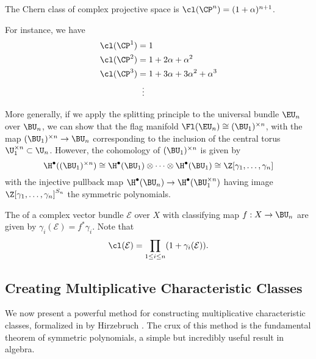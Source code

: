 \begin{corollary}
	The Chern class of complex projective space is $\cl(\CP^n)=(1+\alpha)^{n+1}$.
\end{corollary}
\begin{example}
	For instance, we have
	\[
		\begin{aligned}
			\cl(\CP^1) &= 1\\
			\cl(\CP^2) &= 1+2\alpha+\alpha^2\\
			\cl(\CP^3) &= 1+3\alpha + 3\alpha^2+\alpha^3\\
								 &\;\;\vdots
		\end{aligned}
	\]
\end{example}

More generally, if we apply the splitting principle to the universal bundle $\EU_n$ over $\BU_n$, we can show that the flag manifold $\Fl(\EU_n)\cong (\BU_1)^{\times n}$, with the map $(\BU_1)^{\times n} \to \BU_n$ corresponding to the inclusion of the central torus $\U_1^{\times n}\subset \U_n$. However, the cohomology of $(\BU_1)^{\times n}$ is given by
\[
	\H^\bullet((\BU_1)^{\times n}) \cong \H^\bullet(\BU_1)\otimes\cdots\otimes \H^\bullet(\BU_1) \cong \Z[\gamma_1,\ldots,\gamma_n]
\]
with the injective pullback map $\H^\bullet(\BU_n) \to \H^\bullet(\BU_1^{\times n})$ having image $\Z[\gamma_1,\ldots, \gamma_n]^{S_n}$ the symmetric polynomials.


\begin{definition}\label{def:chern-roots}
	The  of a complex vector bundle $\mathcal{E}$ over $X$ with classifying map $f : X \to \BU_n$ are given by $\gamma_i(\mathcal{E}) = f^*\gamma_i$. Note that
	\[ \cl(\mathcal{E}) = \prod_{1\leq i \leq n} (1+\gamma_i(\mathcal{E})). \]
\end{definition}

\subsection{Creating Multiplicative Characteristic Classes}

We now present a powerful method for constructing multiplicative characteristic classes, formalized in by Hirzebruch \cite{hirzebruch1966methods}. 
The crux of this method is the fundamental theorem of symmetric polynomials, a simple but incredibly useful result in algebra.

